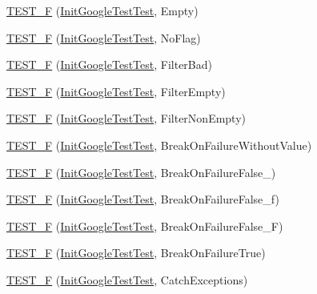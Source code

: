 \begin{DoxyCompactItemize}
\item 
\hyperlink{namespacetesting_ae80ccfaa178730f49af649cd044e84e4}{T\+E\+S\+T\+\_\+\+F} (\hyperlink{classtesting_1_1_init_google_test_test}{Init\+Google\+Test\+Test}, Empty)
\item 
\hyperlink{namespacetesting_add96563b5ca11c20fe2766a848c2bb63}{T\+E\+S\+T\+\_\+\+F} (\hyperlink{classtesting_1_1_init_google_test_test}{Init\+Google\+Test\+Test}, No\+Flag)
\item 
\hyperlink{namespacetesting_ab368a135e5a7a59bceb912a5f636004a}{T\+E\+S\+T\+\_\+\+F} (\hyperlink{classtesting_1_1_init_google_test_test}{Init\+Google\+Test\+Test}, Filter\+Bad)
\item 
\hyperlink{namespacetesting_a04d011d2e5695513c45216ae1b98095b}{T\+E\+S\+T\+\_\+\+F} (\hyperlink{classtesting_1_1_init_google_test_test}{Init\+Google\+Test\+Test}, Filter\+Empty)
\item 
\hyperlink{namespacetesting_a69dcb047e8cf4f93e8132faf11ba7110}{T\+E\+S\+T\+\_\+\+F} (\hyperlink{classtesting_1_1_init_google_test_test}{Init\+Google\+Test\+Test}, Filter\+Non\+Empty)
\item 
\hyperlink{namespacetesting_afc3e46c96f27aa2b502b15e8e4bab2ca}{T\+E\+S\+T\+\_\+\+F} (\hyperlink{classtesting_1_1_init_google_test_test}{Init\+Google\+Test\+Test}, Break\+On\+Failure\+Without\+Value)
\item 
\hyperlink{namespacetesting_abd2b3ac615374fbe560ba35be4c4e928}{T\+E\+S\+T\+\_\+\+F} (\hyperlink{classtesting_1_1_init_google_test_test}{Init\+Google\+Test\+Test}, Break\+On\+Failure\+False\+\_)
\item 
\hyperlink{namespacetesting_abb038e044a4f2142414624e482b48eeb}{T\+E\+S\+T\+\_\+\+F} (\hyperlink{classtesting_1_1_init_google_test_test}{Init\+Google\+Test\+Test}, Break\+On\+Failure\+False\+\_\+f)
\item 
\hyperlink{namespacetesting_aec19373865e49dbd1fe7f22c8db4a256}{T\+E\+S\+T\+\_\+\+F} (\hyperlink{classtesting_1_1_init_google_test_test}{Init\+Google\+Test\+Test}, Break\+On\+Failure\+False\+\_\+\+F)
\item 
\hyperlink{namespacetesting_aaf881d7ee8cfa238e9a66d0562937fde}{T\+E\+S\+T\+\_\+\+F} (\hyperlink{classtesting_1_1_init_google_test_test}{Init\+Google\+Test\+Test}, Break\+On\+Failure\+True)
\item 
\hyperlink{namespacetesting_af59442310531cd96d8aa3ce5acb2d025}{T\+E\+S\+T\+\_\+\+F} (\hyperlink{classtesting_1_1_init_google_test_test}{Init\+Google\+Test\+Test}, Catch\+Exceptions)
\item 

\end{DoxyCompactItemize}
